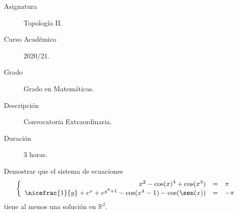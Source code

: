 \documentclass[12pt]{article}
\begin{document}

    
    

    \begin{description}
        \item[Asignatura] Topología II.
        \item[Curso Académico] 2020/21.
        \item[Grado] Grado en Matemáticas.
        \item[Descripción] Convocatoria Extraordinaria.
        \item[Duración] 3 horas.
    \end{description}
    \newpage



    \begin{ejercicio}[2 puntos]
        Demostrar que el sistema de ecuaciones
        \begin{equation*}
            \left\{\begin{array}{rcl}
                    x^2-\cos(x)^3 + \cos(x^3) & = & \pi \\
                    \nicefrac{1}{y}+e^x + e^{y^4+1}-\cos(x^4-1)-\cos(\sen(x)) &=&-\pi
            \end{array}\right.
        \end{equation*}
        tiene al menos una solución en $\mathbb{R}^2$.
    \end{ejercicio}
\end{document}
